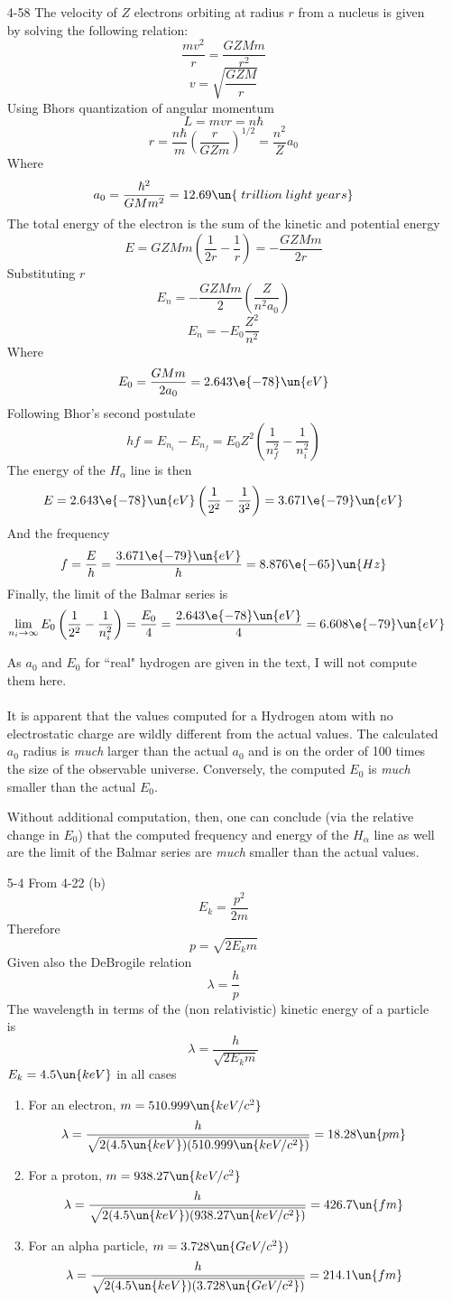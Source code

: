 \documentclass[]{2620hw}
\begin{document}
\begin{enumerate}
\item [4-58] The velocity of $Z$ electrons orbiting at radius $r$ from a nucleus is given by solving the following relation:
\[
	\frac{mv^2}{r} = \frac{GZMm}{r^2}
\]
\[
	v = \sqrt{ \frac{GZM}{r} }
\]
Using Bhors quantization of angular momentum
\[
	L = mvr = n \hbar
\]
\[
	r = \frac{n \hbar}{m} \left( \frac{r}{GZm} \right)^{1/2} = \frac{n^2}{Z}a_0
\]
Where
\[
	a_0 = \frac{\hbar^2}{GMm^2} = 12.69 \un{\; trillion\; light\; years}
\]
The total energy of the electron is the sum of the kinetic and potential energy 
\[
	E = GZMm  \left( \frac{1}{2r} - \frac{1}{r} \right)= - \frac{GZMm}{2r}
\]
Substituting $r$
\[
	E_n = - \frac{GZMm}{2} \left( \frac{Z}{n^2 a_0} \right)
\]
\[
	E_n = -E_0 \frac{Z^2}{n^2}
\]
Where 
\[
	E_0 = \frac{GMm}{2a_0} = 2.643\e{-78}\un{eV}
\]
Following Bhor's second postulate
\[
	hf = E_{n_i} - E_{n_f} = E_0Z^2 \left( \frac{1}{n_f^2} - \frac{1}{n_i^2} \right)
\]
The energy of the $H_{\alpha}$ line is then
\[
	E = 2.643\e{-78}\un{eV} \left( \frac{1}{2^2} - \frac{1}{3^2} \right) = 3.671\e{-79}\un{eV}
\]
And the frequency 
\[
	f = \frac{E}{h} = \frac{3.671\e{-79}\un{eV}}{h} = 8.876\e{-65}\un{Hz}
\]
Finally, the limit of the Balmar series is
\[
	\lim_{n_i \rightarrow \infty} E_0\left( \frac{1}{2^2} - \frac{1}{n_i^2} \right) = \frac{E_0}{4} =  \frac{2.643\e{-78}\un{eV}}{4} = 6.608\e{-79}\un{eV}
\]

As $a_0$ and $E_0$ for ``real" hydrogen are given in the text, I will not compute them here.\\\\
It is apparent that the values computed for a Hydrogen atom with no electrostatic charge are wildly different from the actual values. The calculated $a_0$ radius is \textit{much} larger than the actual $a_0$ and is on the order of 100 times the size of the observable universe. Conversely, the computed $E_0$ is \textit{much} smaller than the actual $E_0$.

Without additional computation, then, one can conclude (via the relative change in $E_0$) that the computed frequency and energy of the $H_{\alpha}$ line as well are the limit of the Balmar series are \textit{much} smaller than the actual values. 

\item [5-4] From 4-22 (b)
	\[
		E_k = \frac{p^2}{2m} 
	\]
	Therefore 
	\[
		p = \sqrt{2E_km}
	\]
	Given also the DeBrogile relation
	\[
		\lambda = \frac{h}{p}
	\]
	The wavelength in terms of the (non relativistic) kinetic energy of a particle is
	\[
		\lambda = \frac{h}{\sqrt{2E_km}}
	\]
	$E_k = 4.5\un{keV}$ in all cases
\begin{enumerate}
    \item For an electron, $m = 510.999\un{keV/c^2}$
	\[
		\lambda = \frac{h}{\sqrt{2(4.5\un{keV})(510.999\un{keV/c^2})}} = 18.28\un{pm}
	\]
	\item For a proton, $m = 938.27\un{keV/c^2}$
	\[
		\lambda = \frac{h}{\sqrt{2(4.5\un{keV})(938.27\un{keV/c^2})}} = 426.7\un{fm}
	\]
	\item For an alpha particle, $m = 3.728\un{GeV/c^2})$
	\[
		\lambda = \frac{h}{\sqrt{2(4.5\un{keV})(3.728\un{GeV/c^2})}} = 214.1\un{fm}
	\]
	

\end{enumerate}
\end{enumerate}
\end{document}
